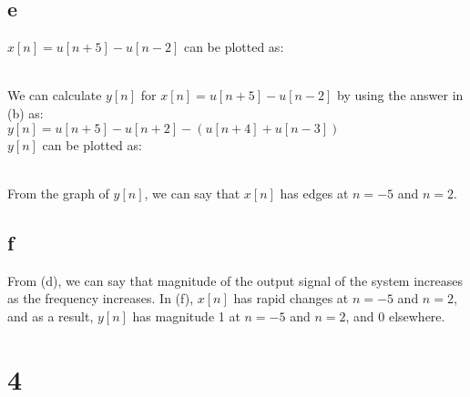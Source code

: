 \documentclass[12pt]{article}
\begin{document}
    \subsection*{e}
    \(x[n] = u[n+5] - u[n-2]\) can be plotted as:\\
    \\
    We can calculate \(y[n]\) for \(x[n] = u[n+5] - u[n-2]\) by using the answer in 
    (b) as:\\
    \begin{math}
      y[n] = u[n+5] - u[n+2] - (u[n+4] + u[n-3]) 
    \end{math}\\ 
    \(y[n]\) can be plotted as:\\
    \\
    From the graph of \(y[n]\), we can say that \(x[n]\) has edges at \(n=-5\) 
    and \(n=2\). 

    \subsection*{f}
    From (d), we can say that magnitude of the output signal of the system 
    increases as the frequency increases. In (f), \(x[n]\) has rapid changes at 
    \(n=-5\) and \(n=2\), and as a result, \(y[n]\) has magnitude 1 at \(n=-5\) and 
    \(n=2\), and 0 elsewhere.

    \section*{4}
\end{document}
